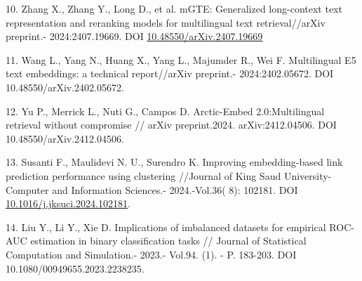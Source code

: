 \begin{refs}
10. Zhang X., Zhang Y., Long D., et al. mGTE: Generalized long-context
text representation and reranking models for multilingual text
retrieval//arXiv preprint.- 2024:2407.19669. DOI
\href{https://doi.org/10.48550/arXiv.2407.19669}{10.48550/arXiv.2407.19669}

11. Wang L., Yang N., Huang X., Yang L., Majumder R., Wei F.
Multilingual E5 text embeddings: a technical report//arXiv preprint.-
2024:2402.05672. DOI 10.48550/arXiv.2402.05672.

12. Yu P., Merrick L., Nuti G., Campos D. Arctic-Embed 2.0:Multilingual
retrieval without compromise // arXiv preprint.2024. arXiv:2412.04506. DOI
10.48550/arXiv.2412.04506.

13. Susanti F., Maulidevi N. U., Surendro K. Improving embedding-based
link prediction performance using clustering //Journal of King Saud
University-Computer and Information Sciences.- 2024.-Vol.36( 8):
102181. DOI
\href{https://doi.org/10.1016/j.jksuci.2024.102181}{10.1016/j.jksuci.2024.102181}.

14. Liu Y., Li Y., Xie D. Implications of imbalanced datasets for
empirical ROC-AUC estimation in binary classification tasks // Journal
of Statistical Computation and Simulation.- 2023.- Vol.94. (1). - P.
183-203. DOI 10.1080/00949655.2023.2238235.
\end{refs}

